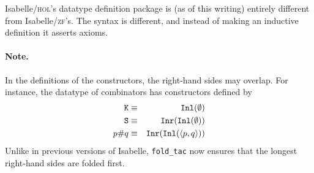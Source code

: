 \documentclass[12pt]{article}
\newcommand\Inl{\hbox{\tt Inl}}
\newcommand\Inr{\hbox{\tt Inr}}
\begin{document}
Isabelle/\textsc{hol}'s datatype definition package is (as of this writing)
entirely different from Isabelle/\textsc{zf}'s.  The syntax is different, and
instead of making an inductive definition it asserts axioms.

\paragraph*{Note.}
In the definitions of the constructors, the right-hand sides may overlap.
For instance, the datatype of combinators has constructors defined by
\begin{eqnarray*}
  {\tt K} & \equiv & \Inl(\emptyset) \\
  {\tt S} & \equiv & \Inr(\Inl(\emptyset)) \\
  p{\tt\#}q & \equiv & \Inr(\Inl(\pair{p,q})) 
\end{eqnarray*}
Unlike in previous versions of Isabelle, \verb|fold_tac| now ensures that the
longest right-hand sides are folded first.

\fi
\end{document}
